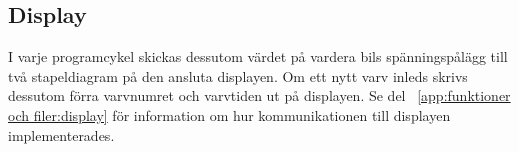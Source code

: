 \subsection{Display}

I varje programcykel skickas dessutom värdet på vardera bils spänningspålägg
till två stapeldiagram på den ansluta displayen. Om ett nytt varv inleds skrivs
dessutom förra varvnumret och varvtiden ut på displayen. Se del~
\ref{app:funktioner och filer:display} för information om hur kommunikationen
till displayen implementerades.

